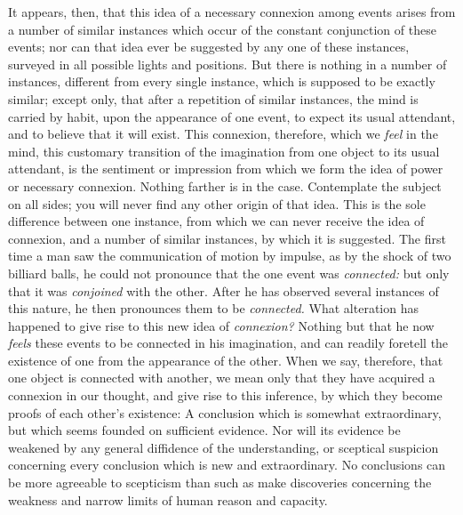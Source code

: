 \documentclass[]{article}
\begin{document}
\begin{sectionbody}
\humeparagraph  It appears, then, that this idea of a necessary connexion among events arises from a number of similar instances which occur of the constant conjunction of these events; nor can that idea ever be suggested by any one of these instances, surveyed in all possible lights and positions. But there is nothing in a number of instances, different from every single instance, which is supposed to be exactly similar; except only, that after a repetition of similar instances, the mind is carried by habit, upon the appearance of one event, to expect its usual attendant, and to believe that it will exist. This connexion, therefore, which we \emph{feel} in the mind, this customary transition of the imagination from one object to its usual attendant, is the sentiment or impression from which we form the idea of power or necessary connexion. Nothing farther is in the case. Contemplate the subject on all sides; you will never find any other origin of that idea. This is the sole difference between one instance, from which we can never receive the idea of connexion, and a number of similar instances, by which it is suggested. The first time a man saw the communication of motion by impulse, as by the shock of two billiard balls, he could not pronounce that the one event was \emph{connected:} but only that it was \emph{conjoined} with the other. After he has observed several instances of this nature, he then pronounces them to be \emph{connected.} What alteration has happened to give rise to this new idea of \emph{connexion?} Nothing but that he now \emph{feels} these events to be connected in his imagination, and can readily foretell the existence of one from the appearance of the other. When we say, therefore, that one object is connected with another, we mean only that they have acquired a connexion in our thought, and give rise to this inference, by which they become proofs of each other's existence: A conclusion which is somewhat extraordinary, but which seems founded on sufficient evidence. Nor will its evidence be weakened by any general diffidence of the understanding, or sceptical suspicion concerning every conclusion which is new and extraordinary. No conclusions can be more agreeable to scepticism than such as make discoveries concerning the weakness and narrow limits of human reason and capacity.


\end{sectionbody}
\end{document}
